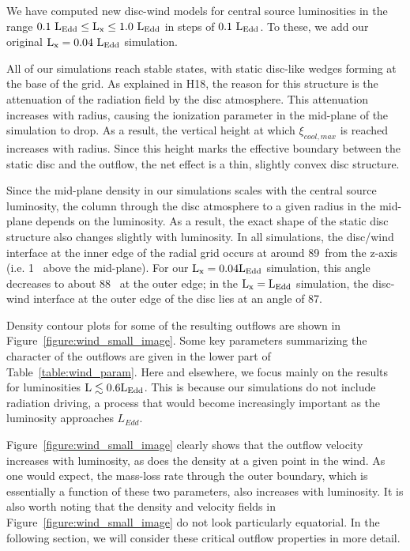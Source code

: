 \documentclass[a4paper,fleqn,usenatbib]{mnras}
\begin{document}
We have computed new disc-wind models for central source luminosities
in the range $\rm{0.1~L_{Edd} \leq L_x \leq 1.0~L_{Edd}}$ in steps of
$\rm{0.1~L_{Edd}}$. To these, we add our original
$\rm{L_x=0.04~L_{Edd}}$ simulation. 

All of our simulations reach stable states, with static disc-like
wedges forming at the base of the grid. As explained in H18, the
reason for this structure is the attenuation of the radiation field by the disc
atmosphere. This attenuation increases with radius, causing the
ionization parameter in the mid-plane of the simulation to drop. As a
result, the vertical height at which $\xi_{cool,max}$ is reached
increases with radius. Since this height marks the effective boundary
between the static disc and the outflow, the net effect is a thin,
slightly convex disc structure. 

Since the mid-plane density in our simulations scales with the central
source luminosity, the column through the disc atmosphere to a given
radius in the mid-plane depends on the luminosity. As a result, the
exact shape of the static disc structure also changes slightly with
luminosity. In all simulations, the disc/wind interface at the
inner edge of the radial grid occurs at around 89\degree~from the
z-axis (i.e. 1\degree~ above the mid-plane). For our $\rm{L_x = 0.04L_{Edd}}$ 
simulation, this angle decreases to about 88\degree~ at the outer
edge; in the $\rm{L_x = L_{Edd}}$ simulation, the disc-wind interface at
the outer edge of the disc lies at an angle of 87\degree.

Density contour plots for some of the resulting outflows are shown in
Figure~\ref{figure:wind_small_image}. Some key parameters summarizing
the character of the outflows are given in the lower part of Table~\ref{table:wind_param}. Here and elsewhere, we focus mainly on the
results for luminosities $\rm{L \lesssim 0.6 L_{Edd}}$. This is
because our simulations do not include radiation driving, a process
that would become increasingly important as the luminosity approaches $L_{Edd}$. 

Figure~\ref{figure:wind_small_image} clearly shows that the outflow
velocity increases with luminosity, as does the density at a given
point in the wind. As one would expect, the mass-loss rate through the
outer boundary, which is essentially a function of these two
parameters, also increases with luminosity. It is also worth noting
that the density and velocity fields in
Figure~\ref{figure:wind_small_image} do not look particularly 
equatorial. In the following section, we
will consider these critical outflow properties in more detail.
\end{document}
